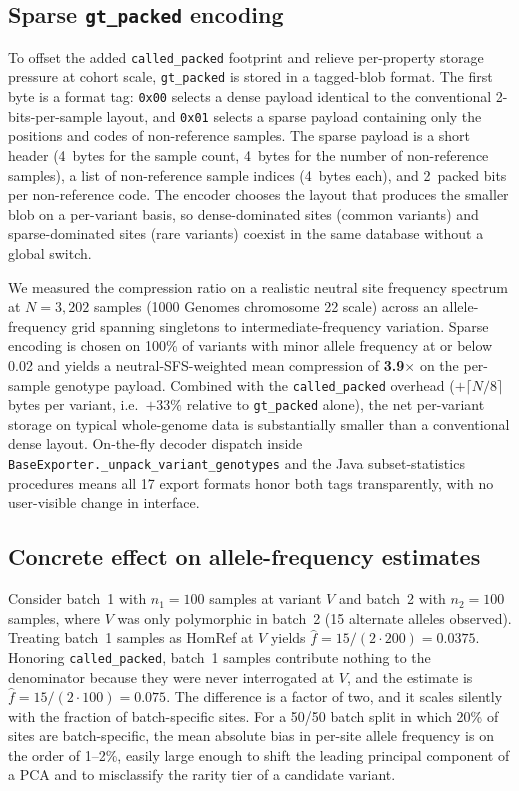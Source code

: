 \documentclass[11pt,a4paper]{article}
\begin{document}
\subsection*{Sparse \texttt{gt\_packed} encoding}

To offset the added \texttt{called\_packed} footprint and relieve per-property storage pressure at cohort scale, \texttt{gt\_packed} is stored in a tagged-blob format. The first byte is a format tag: \texttt{0x00} selects a dense payload identical to the conventional 2-bits-per-sample layout, and \texttt{0x01} selects a sparse payload containing only the positions and codes of non-reference samples. The sparse payload is a short header (4~bytes for the sample count, 4~bytes for the number of non-reference samples), a list of non-reference sample indices (4~bytes each), and 2~packed bits per non-reference code. The encoder chooses the layout that produces the smaller blob on a per-variant basis, so dense-dominated sites (common variants) and sparse-dominated sites (rare variants) coexist in the same database without a global switch.

We measured the compression ratio on a realistic neutral site frequency spectrum at $N=3{,}202$ samples (1000 Genomes chromosome 22 scale) across an allele-frequency grid spanning singletons to intermediate-frequency variation. Sparse encoding is chosen on 100\% of variants with minor allele frequency at or below 0.02 and yields a neutral-SFS-weighted mean compression of \textbf{3.9$\times$} on the per-sample genotype payload. Combined with the \texttt{called\_packed} overhead ($+\lceil N/8 \rceil$ bytes per variant, i.e.\ $+33\%$ relative to \texttt{gt\_packed} alone), the net per-variant storage on typical whole-genome data is substantially smaller than a conventional dense layout. On-the-fly decoder dispatch inside \texttt{BaseExporter.\_unpack\_variant\_genotypes} and the Java subset-statistics procedures means all 17 export formats honor both tags transparently, with no user-visible change in interface.

\subsection*{Concrete effect on allele-frequency estimates}

Consider batch~1 with $n_1 = 100$ samples at variant $V$ and batch~2 with $n_2 = 100$ samples, where $V$ was only polymorphic in batch~2 (15 alternate alleles observed). Treating batch~1 samples as HomRef at $V$ yields $\hat{f} = 15 / (2 \cdot 200) = 0.0375$. Honoring \texttt{called\_packed}, batch~1 samples contribute nothing to the denominator because they were never interrogated at $V$, and the estimate is $\hat{f} = 15 / (2 \cdot 100) = 0.075$. The difference is a factor of two, and it scales silently with the fraction of batch-specific sites. For a 50/50 batch split in which 20\% of sites are batch-specific, the mean absolute bias in per-site allele frequency is on the order of 1--2\%, easily large enough to shift the leading principal component of a PCA and to misclassify the rarity tier of a candidate variant.
\end{document}
